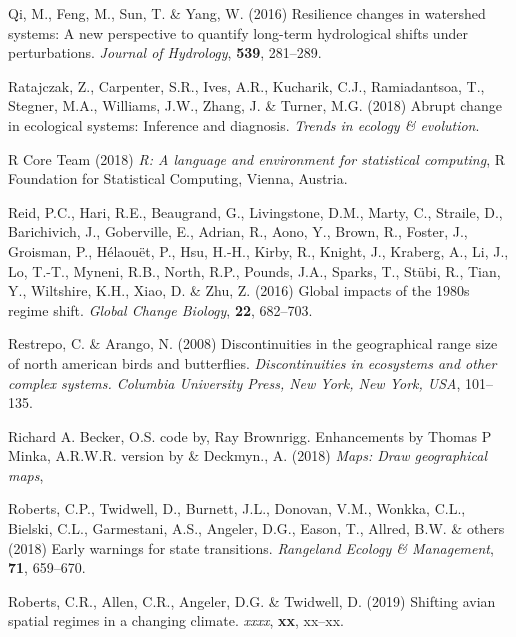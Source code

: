 \documentclass[12pt,twoside,openany]{reedthesis}
\begin{document}
\leavevmode\hypertarget{ref-qi2016resilience}{}%
Qi, M., Feng, M., Sun, T. \& Yang, W. (2016) Resilience changes in watershed systems: A new perspective to quantify long-term hydrological shifts under perturbations. \emph{Journal of Hydrology}, \textbf{539}, 281--289.

\leavevmode\hypertarget{ref-ratajczak2018abrupt}{}%
Ratajczak, Z., Carpenter, S.R., Ives, A.R., Kucharik, C.J., Ramiadantsoa, T., Stegner, M.A., Williams, J.W., Zhang, J. \& Turner, M.G. (2018) Abrupt change in ecological systems: Inference and diagnosis. \emph{Trends in ecology \& evolution}.

\leavevmode\hypertarget{ref-base}{}%
R Core Team (2018) \emph{R: A language and environment for statistical computing}, R Foundation for Statistical Computing, Vienna, Austria.

\leavevmode\hypertarget{ref-reid_global_2016}{}%
Reid, P.C., Hari, R.E., Beaugrand, G., Livingstone, D.M., Marty, C., Straile, D., Barichivich, J., Goberville, E., Adrian, R., Aono, Y., Brown, R., Foster, J., Groisman, P., Hélaouët, P., Hsu, H.-H., Kirby, R., Knight, J., Kraberg, A., Li, J., Lo, T.-T., Myneni, R.B., North, R.P., Pounds, J.A., Sparks, T., Stübi, R., Tian, Y., Wiltshire, K.H., Xiao, D. \& Zhu, Z. (2016) Global impacts of the 1980s regime shift. \emph{Global Change Biology}, \textbf{22}, 682--703.

\leavevmode\hypertarget{ref-restrepo2008discontinuities}{}%
Restrepo, C. \& Arango, N. (2008) Discontinuities in the geographical range size of north american birds and butterflies. \emph{Discontinuities in ecosystems and other complex systems. Columbia University Press, New York, New York, USA}, 101--135.

\leavevmode\hypertarget{ref-maps}{}%
Richard A. Becker, O.S. code by, Ray Brownrigg. Enhancements by Thomas P Minka, A.R.W.R. version by \& Deckmyn., A. (2018) \emph{Maps: Draw geographical maps},

\leavevmode\hypertarget{ref-roberts2018early}{}%
Roberts, C.P., Twidwell, D., Burnett, J.L., Donovan, V.M., Wonkka, C.L., Bielski, C.L., Garmestani, A.S., Angeler, D.G., Eason, T., Allred, B.W. \& others (2018) Early warnings for state transitions. \emph{Rangeland Ecology \& Management}, \textbf{71}, 659--670.

\leavevmode\hypertarget{ref-roberts2019shifting}{}%
Roberts, C.R., Allen, C.R., Angeler, D.G. \& Twidwell, D. (2019) Shifting avian spatial regimes in a changing climate. \emph{xxxx}, \textbf{xx}, xx--xx.
\end{document}
